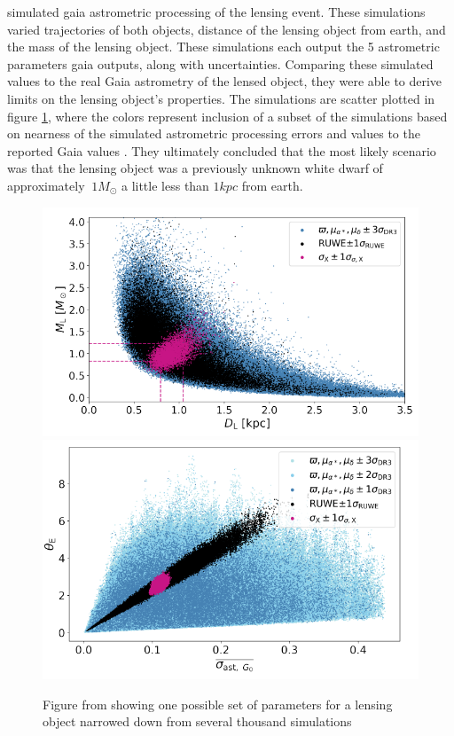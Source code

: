 \documentclass[preprint2]{aastex631}
\begin{document}
\cite{jablonskaThere2022} simulated gaia astrometric processing of the lensing event. These simulations varied trajectories of both objects, distance of the lensing object from earth, and the mass of the lensing object. These simulations each output the 5 astrometric parameters gaia outputs, along with uncertainties. Comparing these simulated values to the real Gaia astrometry of the lensed object, they were able to derive limits on the lensing object's properties. The simulations are scatter plotted in figure \ref{fig:simulation}, where the colors represent inclusion of a subset of the simulations based on nearness of the simulated astrometric processing errors and values to the reported Gaia values \citep{jablonskaThere2022}. They ultimately concluded that the most likely scenario was that the lensing object was a previously unknown white dwarf of approximately $~1 M_\odot$ a little less than $1 kpc$ from earth.

\begin{figure}
	\includegraphics[width=\columnwidth]{microlensingsimMD.png}
	\includegraphics[width=\columnwidth]{microlensingsimTheta.png}
	\caption{Figure from \cite{jablonskaThere2022} showing one possible set of parameters for a lensing object narrowed down from several thousand simulations}
	\label{fig:simulation}
\end{figure}
\end{document}
